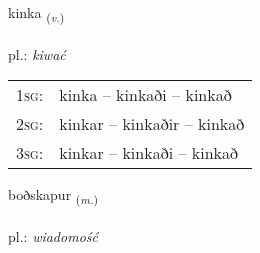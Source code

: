 \documentclass[frontgrid, backgrid]{flacards}\usepackage[]{graphicx}\usepackage[]{xcolor}
\begin{document}
\renewcommand{\flhead}{\vskip5pt \fboxsep=0pt {\small\bfseries\footnotesize Sagnorð | czasownik}}
\renewcommand{\fcfoot}{\vskip5pt \fboxsep=0pt \hspace{2pt}{\small\bfseries\footnotesize 3K}}

\renewcommand{\blhead}{\vskip5pt {\small\bfseries\footnotesize Sagnorð | czasownik }}
\renewcommand{\bcfoot}{\vskip5pt \hspace{2pt}{\small\bfseries\footnotesize 3K}}


{kinka \small{\textsubscript{(\textit{v.})}} \\[1ex] %
\textphonetic{[cʰiŋ̥ka]} \\
pl.: \emph{kiwać} \\  [2ex]
\renewcommand*{\arraystretch}{0.8}
\begin{tabular}{p{1cm}l}
\textsc{1sg}: & kinka -- kinkaði -- kinkað \\ 
\textsc{2sg}: & kinkar -- kinkaðir -- kinkað \\ 
\textsc{3sg}: & kinkar -- kinkaði -- kinkað \\ 
\end{tabular}
}

\renewcommand{\flhead}{\vskip5pt \fboxsep=0pt {\small\bfseries\footnotesize Nafnorð | rzeczownik}}
\renewcommand{\fcfoot}{\vskip5pt \fboxsep=0pt \hspace{2pt}{\small\bfseries\footnotesize 3K}}

\renewcommand{\blhead}{\vskip5pt {\small\bfseries\footnotesize Nafnorð | rzeczownik }}
\renewcommand{\bcfoot}{\vskip5pt \hspace{2pt}{\small\bfseries\footnotesize 3K}}


{boðskapur \small{\textsubscript{(\textit{m.})}} \\[1ex] %
\textphonetic{[pɔðskapʏr]} \\
pl.: \emph{wiadomość} \\  [2ex]
\renewcommand*{\arraystretch}{0.8}
}
\end{document}
